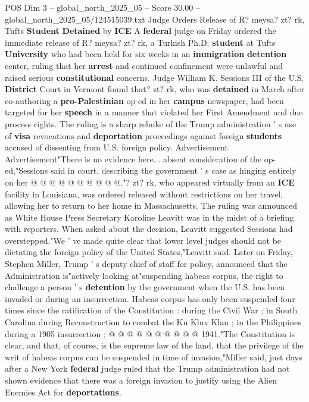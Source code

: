 \begin{textsample}{POS Dim 3 – global\_north\_2025\_05 – Score 30.00 – global\_north\_2025\_05/124515039.txt}  \label{ex:f3_pos_142}
Judge Orders Release of R? meysa? zt? rk, Tufts \textbf{Student} \textbf{Detained} by \textbf{ICE} A \textbf{federal} judge on Friday ordered the immediate release of R? meysa? zt? rk, a Turkish Ph.D. \textbf{student} at Tufts \textbf{University} who had been held for six weeks in an \textbf{immigration} \textbf{detention} center, ruling that her \textbf{arrest} and continued confinement were unlawful and raised serious \textbf{constitutional} concerns.
Judge William K.
Sessions III of the U.S. \textbf{District} Court in Vermont found that? zt? rk, who was \textbf{detained} in March after co-authoring a \textbf{pro-Palestinian} op-ed in her \textbf{campus} newspaper, had been targeted for her \textbf{speech} in a manner that violated her First Amendment and due process rights.
The ruling is a sharp rebuke of the Trump administration ' s use of \textbf{visa} revocations and \textbf{deportation} proceedings against foreign \textbf{students} accused of dissenting from U.S. foreign policy.
Advertisement Advertisement"There is no evidence here... absent consideration of the op-ed,"Sessions said in court, describing the government ' s case as hinging entirely on her @ @ @ @ @ @ @ @ @ @."? zt? rk, who appeared virtually from an \textbf{ICE} facility in Louisiana, was ordered released without restrictions on her travel, allowing her to return to her home in Massachusetts.
The ruling was announced as White House Press Secretary Karoline Leavitt was in the midst of a briefing with reporters.
When asked about the decision, Leavitt suggested Sessions had overstepped."We ' ve made quite clear that lower level judges should not be dictating the foreign policy of the United States,"Leavitt said.
Later on Friday, Stephen Miller, Trump ' s deputy chief of staff for policy, announced that the Administration is"actively looking at"suspending habeas corpus, the right to challenge a person ' s \textbf{detention} by the government when the U.S. has been invaded or during an insurrection.
Habeas corpus has only been suspended four times since the ratification of the Constitution : during the Civil War ; in South Carolina during Reconstruction to combat the Ku Klux Klan ; in the Philippines during a 1905 insurrection ; @ @ @ @ @ @ @ @ @ @ 1941."The Constitution is clear, and that, of course, is the supreme law of the land, that the privilege of the writ of habeas corpus can be suspended in time of invasion,"Miller said, just days after a New York \textbf{federal} judge ruled that the Trump administration had not shown evidence that there was a foreign invasion to justify using the Alien Enemies Act for \textbf{deportations}.

\end{textsample}
